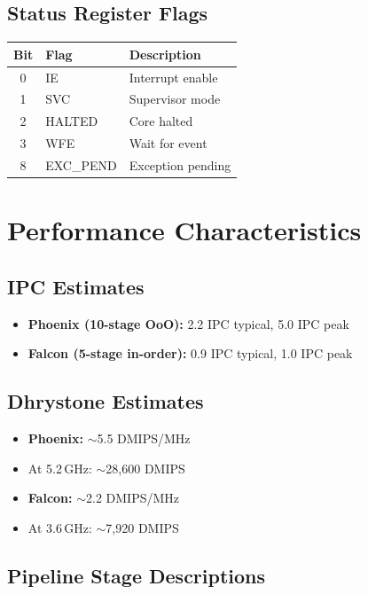 \documentclass[11pt,a4paper]{article}
\begin{document}
\subsection{Status Register Flags}
\begin{table}[H]
\centering
\begin{tabular}{cll}
\toprule
Bit & Flag   & Description \\
\midrule
0   & IE     & Interrupt enable \\
1   & SVC    & Supervisor mode \\
2   & HALTED & Core halted \\
3   & WFE    & Wait for event \\
8   & EXC\_PEND & Exception pending \\
\bottomrule
\end{tabular}
\end{table}

\newpage

\section{Performance Characteristics}

\subsection{IPC Estimates}
\begin{itemize}[nosep]
  \item \textbf{Phoenix (10-stage OoO):} 2.2 IPC typical, 5.0 IPC peak
  \item \textbf{Falcon (5-stage in-order):} 0.9 IPC typical, 1.0 IPC peak
\end{itemize}

\subsection{Dhrystone Estimates}
\begin{itemize}[nosep]
  \item \textbf{Phoenix:} $\sim$5.5 DMIPS/MHz
  \item At 5.2\,GHz: $\sim$28,600 DMIPS
  \item \textbf{Falcon:} $\sim$2.2 DMIPS/MHz
  \item At 3.6\,GHz: $\sim$7,920 DMIPS
\end{itemize}

\subsection{Pipeline Stage Descriptions}
\end{document}
